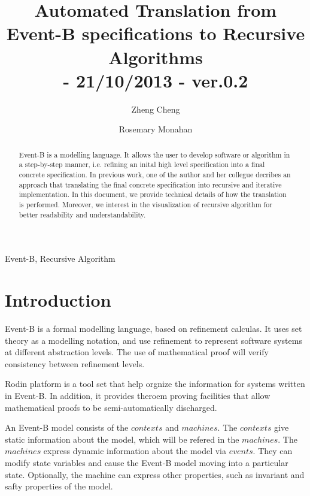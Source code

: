 \documentclass{easychair}
\newenvironment{keywords}{
       \list{}{\advance\topsep by0.35cm\relax\small
       \leftmargin=1cm
       \labelwidth=0.35cm
       \listparindent=0.35cm
       \itemindent\listparindent
       \rightmargin\leftmargin}\item[\hskip\labelsep
                                     \bfseries Keywords:]}
     {\endlist}
\begin{document}
\pagestyle{plain}

\title{Automated Translation from Event-B specifications to Recursive Algorithms
\\\small{- 21/10/2013 - ver.0.2} 
}
\author{
Zheng Cheng \and
Rosemary Monahan 
}


\maketitle  

\begin{abstract}
Event-B is a modelling language. It allows the user to develop software or algorithm in a step-by-step manner, i.e. refining an inital high level specification into a final concrete specification. In previous work, one of the author and her collegue decribes an approach that translating the final concrete specification into recursive and iterative implementation. In this document, we provide technical details of how the translation is performed. Moreover, we interest in the visualization of recursive algorithm for better readability and understandability.
 
\end{abstract}   

\begin{keywords}
 Event-B,
 Recursive Algorithm
\end{keywords}

\section{Introduction} %
Event-B is a formal modelling language, based on refinement calculas. It uses set theory as a modelling notation, and use refinement to represent software systems at different abstraction levels. The use of mathematical proof will verify consistency between refinement levels.

Rodin platform is a tool set that help orgnize the information for systems written in Event-B. In addition, it provides theroem proving facilities that allow mathematical proofs to be semi-automatically discharged.

An Event-B model consists of the $contexts$ and $machines$. The $contexts$ give static information about the model, which will be refered in the $machines$. The $machines$ express dynamic information about the model via $events$. They can modify state variables and cause the Event-B model moving into a particular state. Optionally, the machine can express other properties, such as invariant and safty properties of the model.
\end{document}
